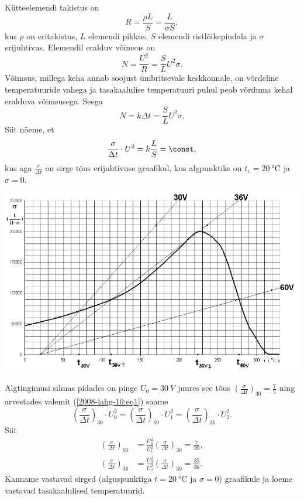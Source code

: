 \documentclass[10pt]{article}
\begin{document}
{%

\solu
Kütteelemendi takistus on
\[
R=\frac{\rho L}{S}=\frac{L}{\sigma S},
\]
kus $\rho$ on eritakistus, $L$ elemendi pikkus, $S$ elemendi ristlõikepindala ja $\sigma$ erijuhtivus. Elemendil eralduv võimsus on
\[
N=\frac{U^{2}}{R}=\frac{S}{L} U^{2} \sigma.
\]
Võimsus, millega keha annab soojust ümbritsevale keskkonnale, on võrdeline temperatuuride vahega ja tasakaalulise temperatuuri puhul peab võrduma kehal eralduva võimsusega. Seega
\[
N=k \Delta t=\frac{S}{L} U^{2} \sigma.
\]
Siit näeme, et
\begin{equation} \label{2008-lahg-10:eq1}
\frac{\sigma}{\Delta t} \cdot U^{2}=k \frac{L}{S}=\const,
\end{equation}
kus aga $\frac{\sigma}{\Delta t}$
on sirge tõus erijuhtivuse graafikul, kus algpunktiks on $t_v = \SI{20}{\degreeCelsius}$ ja
$\sigma = \num{0}$.

\begin{center}
	\includegraphics[width=\linewidth]{2008-lahg-10-lah}
\end{center}

Algtingimusi silmas pidades on pinge $U_0 = \SI{30}{V}$ juures see tõus $\left(\frac{\sigma}{\Delta t}\right)_{30}=\frac{7}{5}$ ning arvestades valemit (\ref{2008-lahg-10:eq1}) saame
\[
\left(\frac{\sigma}{\Delta t}\right)_{30} \cdot U_{0}^{2}=\left(\frac{\sigma}{\Delta t}\right)_{60} \cdot U_{1}^{2}=\left(\frac{\sigma}{\Delta t}\right)_{36} \cdot U_{2}^{2}.
\]
Siit 
\[
\begin{aligned}\left(\frac{\sigma}{\Delta t}\right)_{60} &=\frac{U_{0}^{2}}{U_{1}^{2}}\left(\frac{\sigma}{\Delta t}\right)_{30}=\frac{7}{20}, \\\left(\frac{\sigma}{\Delta t}\right)_{36} &=\frac{U_{0}^{2}}{U_{2}^{2}}\left(\frac{\sigma}{\Delta t}\right)_{30}=\frac{35}{36}. \end{aligned}
\]
Kanname vastavad sirged (alguspunktiga $t = \SI{20}{\degreeCelsius}$ ja $\sigma = 0$) graafikule ja loeme vastavad tasakaalulised temperatuurid.

}
\end{document}
